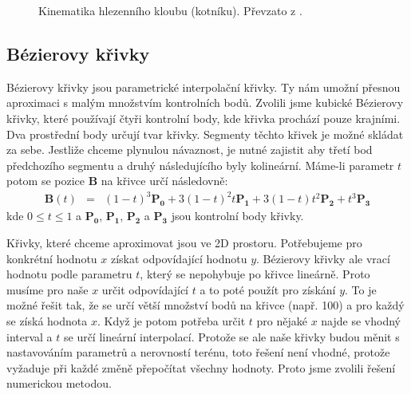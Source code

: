 \begin{figure}[h]
\begin{center}
\caption{Kinematika hlezenního kloubu (kotníku). Převzato z \cite{biomechanika_chuze}.} \label{ankle_kinematics}
\end{center}
\end{figure}

\subsection{Bézierovy křivky}
Bézierovy křivky \cite{bezier_primer} jsou parametrické interpolační křivky. Ty nám umožní přesnou aproximaci s malým množstvím kontrolních bodů. Zvolili jsme kubické Bézierovy křivky, které používají čtyři kontrolní body, kde křivka prochází pouze krajními. Dva prostřední body určují tvar křivky. Segmenty těchto křivek je možné skládat za sebe. Jestliže chceme plynulou návaznost, je nutné zajistit aby třetí bod předchozího segmentu a druhý následujícího byly kolineární. Máme-li parametr $t$ potom se pozice $\mathbf{B}$ na křivce určí následovně:
\begin{eqnarray}
\mathbf{B}(t) &=& (1 - t)^3\mathbf{P_0} + 3(1-t)^2 t\mathbf{P_1} + 3(1-t)t^2\mathbf{P_2} + t^3\mathbf{P_3}
\label{r.bezier}
\end{eqnarray}
kde $0 \leq t \leq 1$ a $\mathbf{P_0}$, $\mathbf{P_1}$, $\mathbf{P_2}$ a $\mathbf{P_3}$ jsou kontrolní body křivky.

Křivky, které chceme aproximovat jsou ve 2D prostoru. Potřebujeme pro konkrétní hodnotu $x$ získat odpovídající hodnotu $y$. Bézierovy křivky ale vrací hodnotu podle parametru $t$, který se nepohybuje po křivce lineárně. Proto musíme pro naše $x$ určit odpovídající $t$ a to poté použít pro získání $y$. To je možné řešit tak, že se určí větší množství bodů na křivce (např. 100) a pro každý se získá hodnota $x$. Když je potom potřeba určit $t$ pro nějaké $x$  najde se vhodný interval a $t$ se určí lineární interpolací. Protože se ale naše křivky budou měnit s nastavováním parametrů a nerovností terénu, toto řešení není vhodné, protože vyžaduje při každé změně přepočítat všechny hodnoty. Proto jsme zvolili řešení numerickou metodou.

